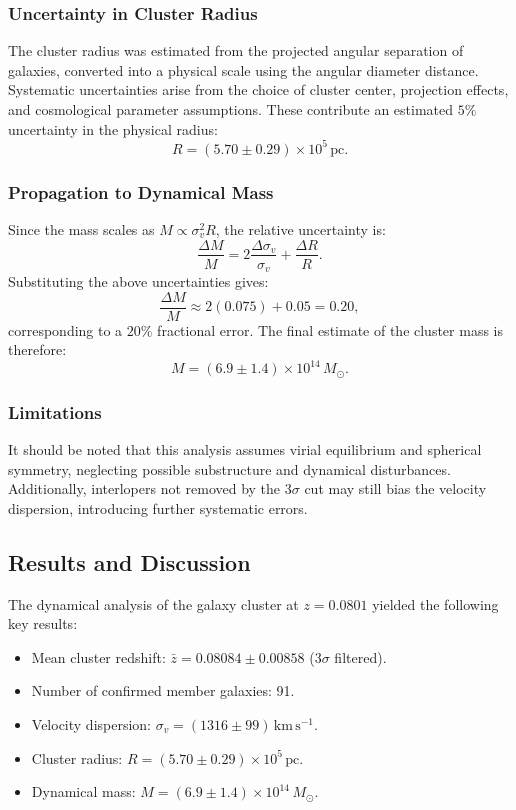 \documentclass[12pt]{article}
\begin{document}
\subsubsection*{Uncertainty in Cluster Radius}
The cluster radius was estimated from the projected angular separation of galaxies, 
converted into a physical scale using the angular diameter distance. Systematic 
uncertainties arise from the choice of cluster center, projection effects, and 
cosmological parameter assumptions. These contribute an estimated $5\%$ 
uncertainty in the physical radius:
\[
    R = (5.70 \pm 0.29) \times 10^{5} \,\mathrm{pc}.
\]

\subsubsection*{Propagation to Dynamical Mass}
Since the mass scales as $M \propto \sigma_v^2 R$, the relative uncertainty is:
\[
    \frac{\Delta M}{M} = 2 \frac{\Delta \sigma_v}{\sigma_v} + \frac{\Delta R}{R}.
\]
Substituting the above uncertainties gives:
\[
    \frac{\Delta M}{M} \approx 2(0.075) + 0.05 = 0.20,
\]
corresponding to a $20\%$ fractional error. The final estimate of the cluster mass is therefore:
\[
    M = (6.9 \pm 1.4) \times 10^{14} \, M_{\odot}.
\]

\subsubsection*{Limitations}
It should be noted that this analysis assumes virial equilibrium and spherical 
symmetry, neglecting possible substructure and dynamical disturbances. 
Additionally, interlopers not removed by the 3$\sigma$ cut may still bias the 
velocity dispersion, introducing further systematic errors.

\subsection{Results and Discussion}
The dynamical analysis of the galaxy cluster at $z = 0.0801$ yielded the following 
key results:

\begin{itemize}
    \item Mean cluster redshift: $\bar{z} = 0.08084 \pm 0.00858$ (3$\sigma$ filtered).
    \item Number of confirmed member galaxies: 91.
    \item Velocity dispersion: $\sigma_v = (1316 \pm 99)\,\mathrm{km \, s^{-1}}$.
    \item Cluster radius: $R = (5.70 \pm 0.29) \times 10^{5}\,\mathrm{pc}$.
    \item Dynamical mass: $M = (6.9 \pm 1.4) \times 10^{14}\, M_{\odot}$.
\end{itemize}
\end{document}
